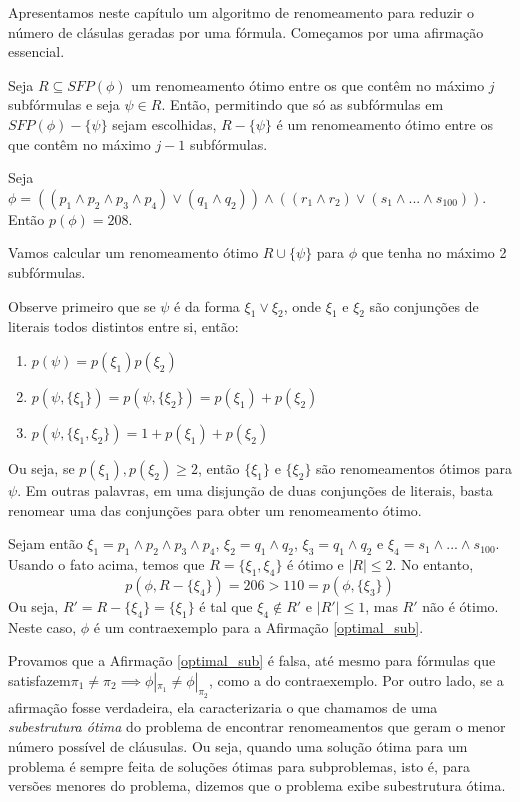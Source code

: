 
\label{cap_algoritmo}

\indent

Apresentamos neste capítulo um algoritmo de renomeamento para reduzir o número de clásulas geradas por uma fórmula. Começamos por uma afirmação essencial.

\begin{affirmation}
	\label{optimal_sub}
	Seja $R \subseteq SFP(\phi)$ um renomeamento ótimo entre os que contêm no máximo $j$ subfórmulas e seja $\psi \in R$. Então, permitindo que só as subfórmulas em $SFP(\phi) - \{\psi \}$ sejam escolhidas, $R - \{\psi\}$ é um renomeamento ótimo entre os que contêm no máximo $j-1$ subfórmulas.
\end{affirmation}

\begin{prova}
Seja $\phi = ((p_1 \wedge p_2 \wedge p_3 \wedge p_4) \vee (q_1 \wedge q_2)) \wedge ((r_1 \wedge r_2) \vee (s_1 \wedge ... \wedge s_{100}))$. Então $p(\phi) = 208$.

Vamos calcular um renomeamento ótimo $R \cup \{\psi \}$ para $\phi$ que tenha no máximo 2 subfórmulas.

Observe primeiro que se $\psi$ é da forma $\xi_1 \vee \xi_2$, onde $\xi_1$ e $\xi_2$ são conjunções de literais todos distintos entre si, então:
\begin{enumerate}
	\item $p(\psi) = p(\xi_1)p(\xi_2)$
	\item $p(\psi, \{\xi_1 \}) = p(\psi, \{\xi_2 \}) = p(\xi_1)+p(\xi_2)$
	\item $p(\psi,\{\xi_1,\xi_2 \}) = 1+p(\xi_1)+p(\xi_2)$
\end{enumerate}
Ou seja, se $p(\xi_1),p(\xi_2) \geq 2$, então $\{\xi_1 \}$ e $\{\xi_2 \}$ são renomeamentos ótimos para $\psi$. Em outras palavras, em uma disjunção de duas conjunções de literais, basta renomear uma das conjunções para obter um renomeamento ótimo.

Sejam então $\xi_1 = p_1 \wedge p_2 \wedge p_3 \wedge p_4$, $\xi_2 = q_1 \wedge q_2$, $\xi_3 = q_1 \wedge q_2$ e $\xi_4 = s_1 \wedge ... \wedge s_{100}$. Usando o fato acima, temos que $R = \{\xi_1,\xi_4 \}$ é ótimo e $|R| \leq 2$. No entanto, $$p(\phi,R - \{\xi_4 \}) = 206 > 110 = p(\phi,\{\xi_3 \})$$ Ou seja, $R' = R - \{\xi_4 \} = \{\xi_1 \}$ é tal que $\xi_4 \notin R'$ e $|R'| \leq 1$, mas $R'$ não é ótimo. Neste caso, $\phi$ é um contraexemplo para a Afirmação \ref{optimal_sub}.
\end{prova}

Provamos que a Afirmação \ref{optimal_sub} é falsa, até mesmo para fórmulas que satisfazem\break $\pi_1 \neq \pi_2 \implies \phi|_{\pi_1} \neq \phi|_{\pi_2}$, como a do contraexemplo. Por outro lado, se a afirmação fosse verdadeira, ela caracterizaria o que chamamos de uma \emph{subestrutura ótima} do problema de encontrar renomeamentos que geram o menor número possível de cláusulas. Ou seja, quando uma solução ótima para um problema é sempre feita de soluções ótimas para subproblemas, isto é, para versões menores do problema, dizemos que o problema exibe subestrutura ótima.


